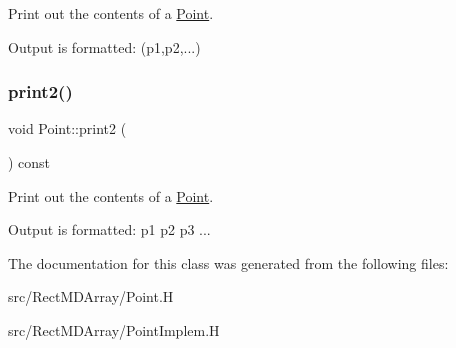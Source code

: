 Print out the contents of a \hyperlink{class_point}{Point}. 

Output is formatted\+: (p1,p2,...) \mbox{\label{class_point_a8d35b17f0c98a44464926cf605e3d7b6}} 
\subsubsection{\texorpdfstring{print2()}{print2()}}
{\footnotesize\ttfamily void Point\+::print2 (\begin{DoxyParamCaption}{ }\end{DoxyParamCaption}) const\hspace{0.3cm}{\ttfamily [inline]}}



Print out the contents of a \hyperlink{class_point}{Point}. 

Output is formatted\+: p1 p2 p3 ... 

The documentation for this class was generated from the following files\+:\begin{DoxyCompactItemize}
\item 
src/\+Rect\+M\+D\+Array/Point.\+H\item 
src/\+Rect\+M\+D\+Array/Point\+Implem.\+H\end{DoxyCompactItemize}
